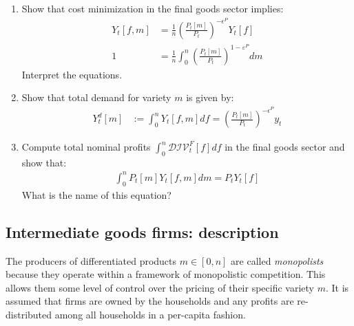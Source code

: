 \begin{enumerate}[resume]

\item
Show that cost minimization in the final goods sector implies:
\begin{align}
Y_{t}[f,m] &= \frac{1}{n} {\left(\frac{P_{t}[m]}{P_{t}}\right)}^{-\epsilon^{P}} Y_{t}[f] \label{eq:NewKeynesian.Firms.Demand}
\\
1 &= \frac{1}{n} \int_{0}^{n} {\left(\frac{P_{t}[m]}{P_{t}}\right)}^{1-\varepsilon^{P}} dm \label{eq:NewKeynesian.Firms.AggregatePriceIndex}
\end{align}
Interpret the equations.

\item
Show that total demand for variety \(m\) is given by:
\begin{align}
Y^{d}_{t}[m] &:= \int_{0}^{n} Y_{t}[f,m] df = {\left(\frac{P_{t}[m]}{P_{t}}\right)}^{-\epsilon^{P}} y_{t} \label{eq:NewKeynesian.Firms.TotalDemand}
\end{align}

\item
Compute total nominal profits \(\int_{0}^{n} \mathcal{DIV}_{t}^{F}[f]df\) in the final goods sector
  and show that:
\begin{align}
\int_{0}^{n} P_{t}[m] Y_{t}[f,m] dm = P_{t} Y_{t}[f] \label{eq:NewKeynesian.Firms.ZeroProfit}
\end{align}
What is the name of this equation?

\end{enumerate}

\newpage

\subsection{Intermediate goods firms: description}
The producers of differentiated products \(m \in [0,n]\) are called \emph{monopolists}
  because they operate within a framework of monopolistic competition.
This allows them some level of control over the pricing of their specific variety \(m\).
It is assumed that firms are owned by the households and any profits are re-distributed among all households in a per-capita fashion.

